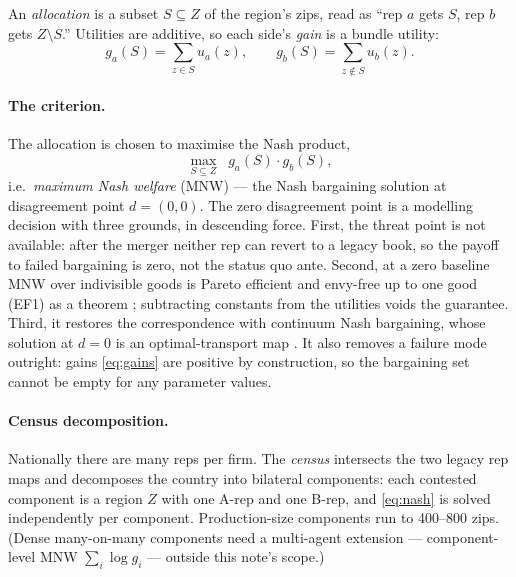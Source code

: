 \documentclass[11pt]{article}
\theoremstyle{definition}
\newcommand{\ga}{g_a}
\newcommand{\gb}{g_b}
\newcommand{\ua}{u_a}
\newcommand{\ub}{u_b}
\begin{document}
An \emph{allocation} is a subset $S\subseteq Z$ of the region's zips, read as ``rep $a$
gets $S$, rep $b$ gets $Z\setminus S$.'' Utilities are additive, so each side's
\emph{gain} is a bundle utility:
\begin{equation}\label{eq:gains}
\ga(S)=\sum_{z\in S}\ua(z), \qquad \gb(S)=\sum_{z\notin S}\ub(z).
\end{equation}

\paragraph{The criterion.}
The allocation is chosen to maximise the Nash product,
\begin{equation}\label{eq:nash}
\max_{S\subseteq Z}\;\; \ga(S)\cdot \gb(S),
\end{equation}
i.e.\ \emph{maximum Nash welfare} (MNW) --- the Nash bargaining solution
\citep{nash1950} at disagreement point $d=(0,0)$. The zero disagreement point is a
modelling decision with three grounds, in descending force. First, the threat point is
not available: after the merger neither rep can revert to a legacy book, so the payoff
to failed bargaining is zero, not the status quo ante. Second, at a zero baseline MNW
over indivisible goods is Pareto efficient and envy-free up to one good (EF1) as a
theorem \citep{caragiannis2019}; subtracting constants from the utilities voids the
guarantee. Third, it restores the correspondence with continuum Nash bargaining, whose
solution at $d=0$ is an optimal-transport map \citep{warren2025}. It also removes a
failure mode outright: gains \eqref{eq:gains} are positive by construction, so the
bargaining set cannot be empty for any parameter values.

\paragraph{Census decomposition.}
Nationally there are many reps per firm. The \emph{census} intersects the two legacy rep
maps and decomposes the country into bilateral components: each contested component is a
region $Z$ with one A-rep and one B-rep, and \eqref{eq:nash} is solved independently per
component. Production-size components run to 400--800 zips. (Dense many-on-many
components need a multi-agent extension --- component-level MNW $\sum_i \log g_i$ ---
outside this note's scope.)
\end{document}
